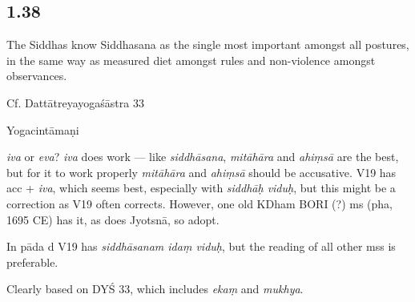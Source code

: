 \begin{ekdosis}
\begin{testimonia}[hp01_037]
\end{testimonia}

\subsection*{1.38}
\begin{translation}[hp01_038]
The Siddhas know Siddhasana as the single most important amongst
all postures, in the same way as measured diet amongst rules and non-violence amongst observances.
\end{translation}

\begin{sources}[hp01_038]
Cf. Dattātreyayogaśāstra 33

\begin{versinnote}
\end{versinnote}

\end{sources}

\begin{testimonia}[hp01_038]
Yogacintāmaṇi

\begin{versinnote}
\end{versinnote}

\end{testimonia}

\begin{philcomm}[hp01_038]
\emph{iva} or \emph{eva}? \emph{iva} does work — like \emph{siddhāsana}, \emph{mitāhāra} and \emph{ahiṃsā} are the best, but for it to work properly \emph{mitāhāra} and \emph{ahiṃsā} should be accusative. V19 has acc + \emph{iva}, which seems best, especially with \emph{siddhāḥ viduḥ}, but this might be a correction as V19 often corrects. However, one old KDham BORI (?) ms (pha, 1695 CE) has it, as does Jyotsnā, so adopt.

In pāda d V19 has \emph{siddhāsanam idaṃ viduḥ}, but the reading of all other mss is preferable.

Clearly based on DYŚ 33, which includes \emph{ekaṃ} and \emph{mukhya}.
\end{philcomm}


\end{ekdosis}
